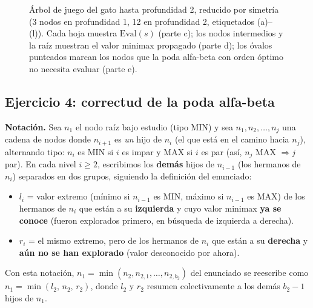\documentclass[11pt,onecolumn,letterpaper]{article}
\begin{document}
\begin{figure}[H]
{%
}
\caption{\'Arbol de juego del gato hasta profundidad 2, reducido por simetr\'ia (3 nodos en
profundidad 1, 12 en profundidad 2, etiquetados (a)--(l)). Cada hoja muestra
$\text{Eval}(s)$ (parte c); los nodos intermedios y la ra\'iz muestran el valor minimax
propagado (parte d); los \'ovalos punteados marcan los nodos que la poda alfa-beta con
orden \'optimo no necesita evaluar (parte e).}
\label{fig:tictactoe-tree}
\end{figure}

\subsection{Ejercicio 4: correctud de la poda alfa-beta}
\label{sec:ex4}

\textbf{Notaci\'on.} Sea $n_1$ el nodo ra\'iz bajo estudio (tipo MIN) y sea $n_1, n_2,
\dots, n_j$ una cadena de nodos donde $n_{i+1}$ es \emph{un} hijo de $n_i$ (el que est\'a en
el camino hacia $n_j$), alternando tipo: $n_i$ es MIN si $i$ es impar y MAX si $i$ es par
(as\'i, $n_j$ MAX $\Rightarrow j$ par). En cada nivel $i\ge2$, escribimos los \textbf{dem\'as}
hijos de $n_{i-1}$ (los hermanos de $n_i$) separados en dos grupos, siguiendo la
definici\'on del enunciado:
\begin{itemize}[leftmargin=1.4em]
\item $l_i$ = valor extremo (m\'inimo si $n_{i-1}$ es MIN, m\'aximo si $n_{i-1}$ es MAX) de
  los hermanos de $n_i$ que est\'an a su \textbf{izquierda} y cuyo valor minimax
  \textbf{ya se conoce} (fueron explorados primero, en b\'usqueda de izquierda a derecha).
\item $r_i$ = el mismo extremo, pero de los hermanos de $n_i$ que est\'an a su
  \textbf{derecha} y \textbf{a\'un no se han explorado} (valor desconocido por ahora).
\end{itemize}
Con esta notaci\'on, $n_1=\min(n_2,n_{2,1},\dots,n_{2,b_2})$ del enunciado se reescribe
como $n_1 = \min(l_2,\, n_2,\, r_2)$, donde $l_2$ y $r_2$ resumen colectivamente a los
dem\'as $b_2-1$ hijos de $n_1$.
\end{document}
